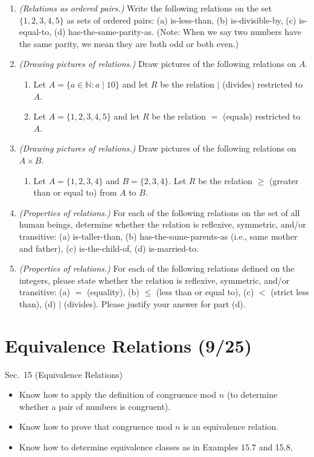 \documentclass[11pt]{article}
\newcommand{\set}[1]{\{ #1 \}}
\begin{document}
\begin{enumerate}
\item \textit{(Relations as ordered pairs.)} Write the following relations on the set $\set{1,2,3,4,5}$ as sets of ordered pairs: (a) is-less-than, (b) is-divisible-by, (c) is-equal-to, (d) has-the-same-parity-as. (Note: When we say two numbers have the same parity, we mean they are both odd or both even.)
\item \textit{(Drawing pictures of relations.)} Draw pictures of the following relations on $A$.
\begin{enumerate}
\item Let $A=\set{a \in \mathbb{N} : a \mid 10}$ and let $R$ be the relation $\mid$ (divides) restricted to $A$.
\item Let $A=\set{1,2,3,4,5}$ and let $R$ be the relation $=$ (equals) restricted to $A$.
\end{enumerate}
\item \textit{(Drawing pictures of relations.)} Draw pictures of the following relations on $A \times B$.
\begin{enumerate}
\item Let $A=\set{1,2,3,4}$ and $B = \set{2,3,4}$. Let $R$ be the relation $\geq$ (greater than or equal to) from $A$ to $B$.
\end{enumerate}
\item \textit{(Properties of relations.)} For each of the following relations on the set of all human beings, determine whether the relation is reflexive, symmetric, and/or transitive: (a) is-taller-than, (b) has-the-same-parents-as (i.e., same mother and father), (c) is-the-child-of, (d) is-married-to.
\item \textit{(Properties of relations.)} For each of the following relations defined on the integers, please state whether the relation is reflexive, symmetric, and/or transitive: (a) $=$ (equality), (b) $\leq$ (less than or equal to), (c) $<$ (strict less than), (d) $\mid$ (divides). Please justify your answer for part (d).
\end{enumerate}

\section*{Equivalence Relations (9/25)}
\begin{textbook}{Sec.~15 (Equivalence Relations)}
\begin{itemize}[leftmargin=*, nosep]
\item Know how to apply the definition of congruence mod $n$ (to determine whether a pair of numbers is congruent).
\item Know how to prove that congruence mod $n$ is an equivalence relation.
\item Know how to determine equivalence classes as in Examples 15.7 and 15.8.
\end{itemize}
\end{textbook}
\end{document}
